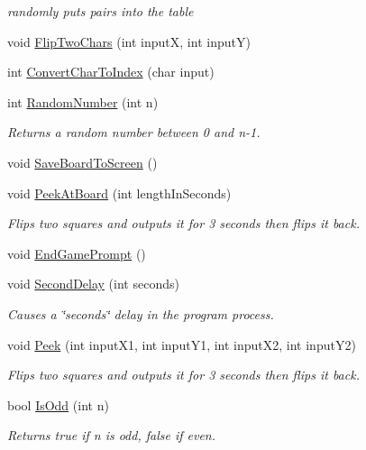 \begin{DoxyCompactItemize}
\begin{DoxyCompactList}\small\item\em randomly puts pairs into the table \end{DoxyCompactList}\item 
void \hyperlink{classMemoryMatch_a9ea522ae206345fc5a6d730ed7ff4adc}{Flip\-Two\-Chars} (int input\-X, int input\-Y)
\item 
int \hyperlink{classMemoryMatch_ae684d58439ac7d7ca9e6dcd8b1c1f977}{Convert\-Char\-To\-Index} (char input)
\item 
int \hyperlink{classMemoryMatch_a0543038015f3bbd9db9e9a235cf12579}{Random\-Number} (int n)
\begin{DoxyCompactList}\small\item\em Returns a random number between 0 and n-\/1. \end{DoxyCompactList}\item 
void \hyperlink{classMemoryMatch_a6d4c54b56ee4f5b4df36b7767e07ebd5}{Save\-Board\-To\-Screen} ()
\item 
void \hyperlink{classMemoryMatch_a56bf6c64798545d880f6d061464ae5a2}{Peek\-At\-Board} (int length\-In\-Seconds)
\begin{DoxyCompactList}\small\item\em Flips two squares and outputs it for 3 seconds then flips it back. \end{DoxyCompactList}\item 
void \hyperlink{classMemoryMatch_a5a3232cd99dddddc6af5d5dc050087f7}{End\-Game\-Prompt} ()
\item 
void \hyperlink{classMemoryMatch_acfc3d904747668225bd52a508d9dcae6}{Second\-Delay} (int seconds)
\begin{DoxyCompactList}\small\item\em Causes a \char`\"{}seconds\char`\"{} delay in the program process. \end{DoxyCompactList}\item 
void \hyperlink{classMemoryMatch_ae78665422f8d46d0c4639916f494845c}{Peek} (int input\-X1, int input\-Y1, int input\-X2, int input\-Y2)
\begin{DoxyCompactList}\small\item\em Flips two squares and outputs it for 3 seconds then flips it back. \end{DoxyCompactList}\item 
bool \hyperlink{classMemoryMatch_a2cdc3fbc35524564a651e3cc1d5d03df}{Is\-Odd} (int n)
\begin{DoxyCompactList}\small\item\em Returns true if n is odd, false if even. \end{DoxyCompactList}\item 

\end{DoxyCompactItemize}
